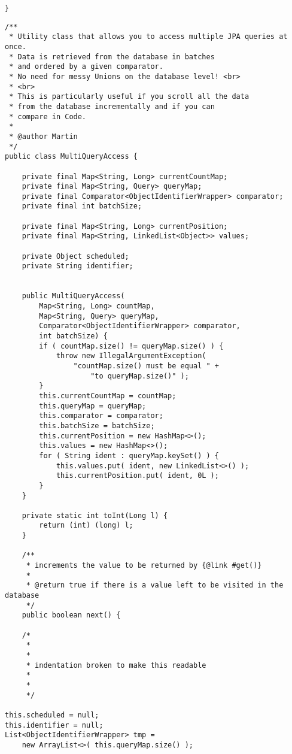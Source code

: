 \begin{lstlisting}[frame=htrbl, caption={generic JPA FullTextEntityManager}, label={lst:FullTextEntityManager.java_generic}]
}
\end{lstlisting}

\lstset{language=java}
\begin{lstlisting}[frame=htrbl, caption={MultiQueryAccess.java}, label={lst:MultiQueryAccess.java}]
/**
 * Utility class that allows you to access multiple JPA queries at once.
 * Data is retrieved from the database in batches
 * and ordered by a given comparator.
 * No need for messy Unions on the database level! <br>
 * <br>
 * This is particularly useful if you scroll all the data 
 * from the database incrementally and if you can 
 * compare in Code.
 *
 * @author Martin
 */
public class MultiQueryAccess {

	private final Map<String, Long> currentCountMap;
	private final Map<String, Query> queryMap;
	private final Comparator<ObjectIdentifierWrapper> comparator;
	private final int batchSize;
	
	private final Map<String, Long> currentPosition;
	private final Map<String, LinkedList<Object>> values;
	
	private Object scheduled;
	private String identifier;


	public MultiQueryAccess(
		Map<String, Long> countMap,
		Map<String, Query> queryMap,
		Comparator<ObjectIdentifierWrapper> comparator,
		int batchSize) {
		if ( countMap.size() != queryMap.size() ) {
			throw new IllegalArgumentException( 
				"countMap.size() must be equal " + 
					"to queryMap.size()" );
		}
		this.currentCountMap = countMap;
		this.queryMap = queryMap;
		this.comparator = comparator;
		this.batchSize = batchSize;
		this.currentPosition = new HashMap<>();
		this.values = new HashMap<>();
		for ( String ident : queryMap.keySet() ) {
			this.values.put( ident, new LinkedList<>() );
			this.currentPosition.put( ident, 0L );
		}
	}

	private static int toInt(Long l) {
		return (int) (long) l;
	}

	/**
	 * increments the value to be returned by {@link #get()}
	 *
	 * @return true if there is a value left to be visited in the database
	 */
	public boolean next() {
	
	/*
	 *
	 *
	 * indentation broken to make this readable
	 *
	 *
	 */
	
this.scheduled = null;
this.identifier = null;
List<ObjectIdentifierWrapper> tmp =
	new ArrayList<>( this.queryMap.size() );


\end{lstlisting}
